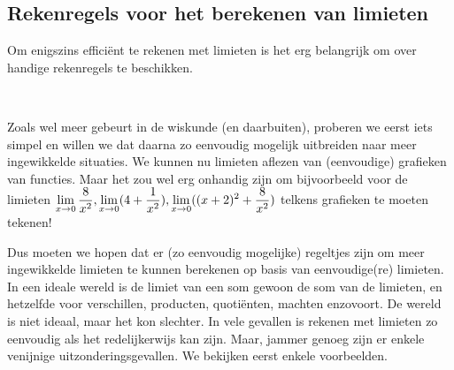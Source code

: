 \documentclass[numbers]{ximera}
\begin{document}
\begin{comment}
	\begin{enumerate}
		\item $\limx    \frac{1}{x^2}=\;$\let\i\localoefoptions
		\item $\limxi   e^x = \;$        \localoefoptions
		\item $\limxmi  e^x = \;$        \localoefoptions
		\item $\rlimx   e^{\frac 1x} = $
		\item $\llimx   e^{\frac 1x} = $
		\item $\limxi   \ln x = $
		\item $\rlimx   \ln x = $
		\item $\limxmi  \ln x = $
		\item $\limxi   \ln(1+ \frac 1x) = $
	\end{enumerate}
\end{exercise}
\end{comment}

\subsection{Rekenregels voor het berekenen van limieten}

Om enigszins efficiënt te rekenen  met limieten is het erg belangrijk om over handige rekenregels te beschikken.

\begin{uitwijding} \ 
	
Zoals wel meer gebeurt in de wiskunde (en daarbuiten), proberen we eerst iets simpel en willen we dat daarna zo eenvoudig mogelijk uitbreiden naar meer ingewikkelde situaties. We kunnen nu limieten aflezen van (eenvoudige) grafieken van functies. Maar het zou wel erg onhandig zijn om bijvoorbeeld voor de limieten $\limx \frac{8}{x^2}, \limx (4+\frac{1}{x^2}), \limx ((x+2)^2 + \frac{8}{x^2})$ telkens grafieken te moeten tekenen! %

Dus moeten we hopen dat er (zo eenvoudig mogelijke) regeltjes zijn om meer ingewikkelde limieten te kunnen berekenen op basis van eenvoudige(re) limieten. In een ideale wereld is de limiet van een som gewoon de som van de limieten, en hetzelfde voor verschillen, producten, quotiënten, machten enzovoort. De wereld is niet ideaal, maar het kon slechter. In vele gevallen is rekenen met limieten  zo eenvoudig als het redelijkerwijs kan zijn. Maar, jammer genoeg zijn er enkele venijnige uitzonderingsgevallen. We bekijken eerst enkele voorbeelden.
\end{uitwijding}
\end{document}
